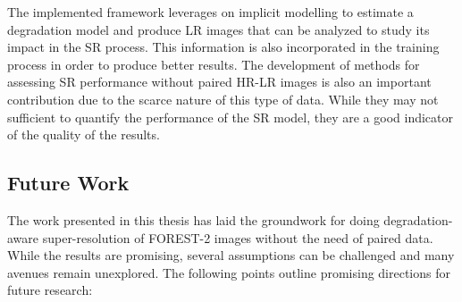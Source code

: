 The implemented framework leverages on implicit modelling to estimate a degradation model and produce LR images that can be analyzed to study its impact in the SR process. This information is also incorporated in the training process in order to produce better results.
The development of methods for assessing SR performance without paired HR-LR images is also an important contribution due to the scarce nature of this type of data. While they may not sufficient to quantify the performance of the SR model, they are a good indicator of the quality of the results.


\subsection{Future Work}

The work presented in this thesis has laid the groundwork for doing degradation-aware super-resolution of FOREST-2 images without the need of paired data. While the results are promising, several assumptions can be challenged and many avenues remain unexplored. The following points outline promising directions for future research:

